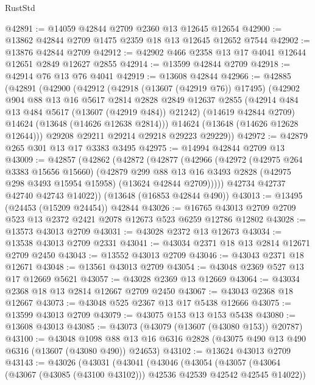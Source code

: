 \begin{lexlean}{RustStd}
\begin{coremodule}
@42891 := @14059 @42844 @2709 @2360 @13 @12645 @12654
@42900 := @13862 @42844 @2709 @1475 @2359 @18 @13 @12645 @12652 @7544
@42902 := @13876 @42844 @2709
@42912 := @42902 @466 @2358 @13 @17 @4041 @12644 @12651 @2849 @12627 @2855
@42914 := @13599 @42844 @2709
@42918 := @42914 @76 @13 @76 @4041
@42919 := @13608 @42844
@42966 := @42885
    (@42891
      (@42900
        (@42912
          (@42918 (@13607 (@42919 @76)) @17495)
          (@42902
            @904
            @88
            @13
            @16
            @5617
            @2814
            @2828
            @2849
            @12637
            @2855
            (@42914 @484 @13 @484 @5617 (@13607 (@42919 @484)) @21242)
            (@14619 @42844 @2709)
            @14624
            (@13648 (@14626 @12638 @2814)))
          @14624
          (@13648 (@14626 @12628 @12644)))
        @29208
        @29211
        @29214
        @29218
        @29223
        @29229))
@42972 := @42879 @265 @301 @13 @17 @3383 @3495
@42975 := @14994 @42844 @2709 @13
@43009 := @42857
    (@42862
      (@42872
        (@42877
          (@42966
            (@42972
              (@42975 @264 @3383 @15656 @15660)
              (@42879
                @299
                @88
                @13
                @16
                @3493
                @2828
                (@42975 @298 @3493 @15954 @15958)
                (@13624 @42844 @2709)))))
        @42734
        @42737
        @42740
        @42743
        @14022))
    (@13648 (@16853 @42844 @490))
@43013 := @13495 (@24453 (@15209 @24454)) @42844
@43026 := @16765 @43013 @2709 @2709 @523 @13 @2372 @2421 @2078 @12673 @523 @6259 @12786 @12802
@43028 := @13573 @43013 @2709
@43031 := @43028 @2372 @13 @12673
@43034 := @13538 @43013 @2709 @2331
@43041 := @43034 @2371 @18 @13 @2814 @12671 @2709 @2450
@43043 := @13552 @43013 @2709
@43046 := @43043 @2371 @18 @12671
@43048 := @13561 @43013 @2709
@43054 := @43048 @2369 @527 @13 @17 @12669 @5621
@43057 := @43028 @2369 @13 @12669
@43064 := @43034 @2368 @18 @13 @2814 @12667 @2709 @2450
@43067 := @43043 @2368 @18 @12667
@43073 := @43048 @525 @2367 @13 @17 @5438 @12666
@43075 := @13599 @43013 @2709
@43079 := @43075 @153 @13 @153 @5438
@43080 := @13608 @43013
@43085 := @43073 (@43079 (@13607 (@43080 @153)) @20787)
@43100 := @43048
    @1098
    @88
    @13
    @16
    @6316
    @2828
    (@43075 @490 @13 @490 @6316 (@13607 (@43080 @490)) @24653)
@43102 := @13624 @43013 @2709
@43143 := @43026
    (@43031
      (@43041
        (@43046
          (@43054
            (@43057 (@43064 (@43067 (@43085 (@43100 @43102))) @42536 @42539 @42542 @42545 @14022))

\end{coremodule}
\end{lexlean}
